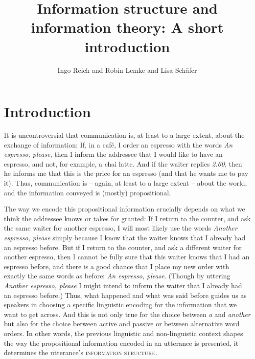 \documentclass[output=paper,colorlinks,citecolor=brown]{langscibook}
\title{Information structure and information theory: A short introduction}
\author{Ingo Reich\orcid{0009-0000-2329-9162}\affiliation{Universität des Saarlandes} and Robin Lemke\orcid{0000-0003-2964-7396}\affiliation{Universität des Saarlandes} and Lisa Schäfer\orcid{0000-0003-0896-2012}\affiliation{Universität des Saarlandes}}
\begin{document}
\maketitle

\section{Introduction} 
It is uncontroversial that communication is, at least to a large extent, about the exchange of information: If, in a café, I order an espresso with the words \textit{An espresso, please}, then I inform the addressee that I would like to have an espresso, and not, for example, a chai latte. And if the waiter replies \textit{2.60}, then he informs me that this is the price for an espresso (and that he wants me to pay it). Thus, communication is -- again, at least to a large extent -- about the world, and the information conveyed is (mostly) propositional. 

The way we encode this propositional information crucially depends on what we think the addressee knows or takes for granted: If I return to the counter, and ask the same waiter for another espresso, I will most likely use the words \textit{Another espresso, please} simply because I know that the waiter knows that I already had an espresso before. But if I return to the counter, and ask a different waiter for another espresso, then I cannot be fully sure that this waiter knows that I had an espresso before, and there is a good chance that I place my new order with exactly the same words as before: \textit{An espresso, please}. (Though by uttering \textit{Another espresso, please} I might intend to inform the waiter that I already had an espresso before.) Thus, what happened and what was said before guides us as speakers in choosing a specific linguistic encoding for the information that we want to get across. And this is not only true for the choice between \textit{a} and \textit{another} but also for the choice between active and passive or between alternative word orders. In other words, the previous linguistic and non-linguistic context shapes the way the propositional information encoded in an utterance is presented, it determines the utterance's \textsc{information structure}.             
\end{document}
